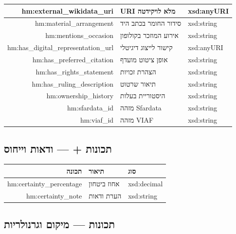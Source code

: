 \documentclass[12pt,a4paper]{article}
\newcommand{\new}[1]{\textcolor{newaddition}{#1}}
\newcommand{\newprop}[1]{\textcolor{newaddition}{#1}}
\begin{document}
\begin{longtable}{|r|p{5cm}|p{3cm}|}
hm:external\_wikidata\_uri & URI מלא לויקידטה & xsd:anyURI\\
\hline

hm:material\_arrangement & סידור החומר בכתב היד & xsd:string\\
\hline

hm:mentions\_occasion & אירוע המוזכר בקולופון & xsd:string\\
\hline

hm:has\_digital\_representation\_url & קישור לייצוג דיגיטלי & xsd:anyURI\\
\hline

hm:has\_preferred\_citation & אופן ציטוט מועדף & xsd:string\\
\hline

hm:has\_rights\_statement & הצהרת זכויות & xsd:string\\
\hline

hm:has\_ruling\_description & תיאור שרטוט & xsd:string\\
\hline

hm:ownership\_history & היסטוריית בעלות & xsd:string\\
\hline

hm:sfardata\_id & מזהה Sfardata & xsd:string\\
\hline

hm:viaf\_id & מזהה VIAF & xsd:string\\
\hline
\end{longtable}

\subsection{\new{תכונות  + — ודאות וייחוס}}

\begin{longtable}{|r|p{5cm}|p{3cm}|}
\hline
\textbf{תכונה} & \textbf{תיאור} & \textbf{סוג} \\
\hline
\endhead

\newprop{hm:certainty\_percentage} & \new{אחוז ביטחון} & \new{xsd:decimal}\\
\hline
\newprop{hm:certainty\_note} & \new{הערת ודאות} & \new{xsd:string}\\
\hline
\end{longtable}

\subsection{\new{תכונות   — מיקום וגרנולריות}}
\end{document}
